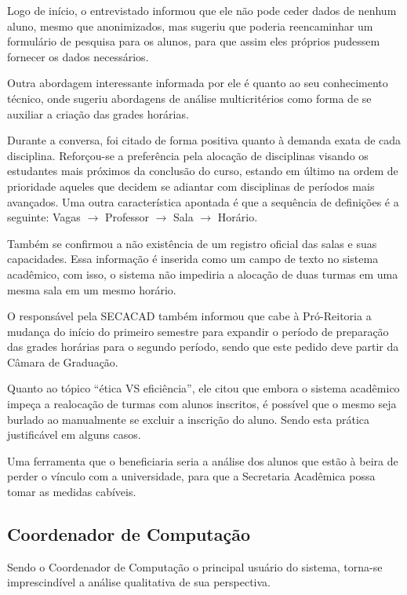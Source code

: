 Logo de início, o entrevistado informou que ele não pode ceder dados de nenhum aluno, mesmo que anonimizados, mas sugeriu que poderia reencaminhar um formulário de pesquisa para os alunos, para que assim eles próprios pudessem fornecer os dados necessários.

Outra abordagem interessante informada por ele é quanto ao seu conhecimento técnico, onde sugeriu abordagens de análise multicritérios como forma de se auxiliar a criação das grades horárias.

Durante a conversa, foi citado de forma positiva quanto à demanda exata de cada disciplina. Reforçou-se a preferência pela alocação de disciplinas visando os estudantes mais próximos da conclusão do curso, estando em último na ordem de prioridade aqueles que decidem se adiantar com disciplinas de períodos mais avançados. Uma outra característica apontada é que a sequência de definições é a seguinte: Vagas $\rightarrow$ Professor $\rightarrow$ Sala $\rightarrow$ Horário.

Também se confirmou a não existência de um registro oficial das salas e suas capacidades. Essa informação é inserida como um campo de texto no sistema acadêmico, com isso, o sistema não impediria a alocação de duas turmas em uma mesma sala em um mesmo horário.

O responsável pela SECACAD também informou que cabe à Pró-Reitoria a mudança do início do primeiro semestre para expandir o período de preparação das grades horárias para o segundo período, sendo que este pedido deve partir da Câmara de Graduação.

Quanto ao tópico ``ética VS eficiência'', ele citou que embora o sistema acadêmico impeça a realocação de turmas com alunos inscritos, é possível que o mesmo seja burlado ao manualmente se excluir a inscrição do aluno. Sendo esta prática justificável em alguns casos.

Uma ferramenta que o beneficiaria seria a análise dos alunos que estão à beira de perder o vínculo com a universidade, para que a Secretaria Acadêmica possa tomar as medidas cabíveis.

\subsection{Coordenador de Computação} %

Sendo o Coordenador de Computação o principal usuário do sistema, torna-se imprescindível a análise qualitativa de sua perspectiva.

